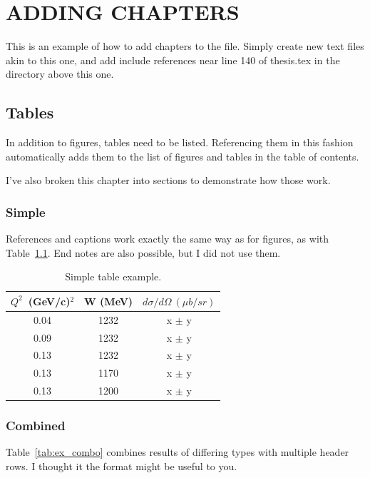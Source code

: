 \chapter{ADDING CHAPTERS}

This is an example of how to add chapters to the file.  Simply create new text files akin to
this one, and add include references near line 140 of thesis.tex in the directory above this one.

\section{Tables} 
In addition to figures, tables need to be listed. 
Referencing them in this fashion automatically adds them to the list of
figures and tables in the table of contents.

I've also broken this chapter into sections to demonstrate how those work.


\subsection{Simple}

References and captions work exactly the same way as for figures, as
with Table~\ref{tab:ex_simple}. End notes are also possible, but I did
not use them.
  


\begin {table}[!htbp]
\caption {Simple table example.} 
\centering
\begin{tabular}{|c |c |c|}
\hline
 $Q^2$~(GeV/c)$^2$	&W (MeV) & $d\sigma/d\Omega~(\mu b/sr)$\\
\hline																	
	0.04 &	1232	&	x	$\pm$ y \\	 \hline
	0.09 &	1232	&	x	$\pm$ y \\			 \hline
	0.13 &	1232	&	x	$\pm$ y \\	
\hline
	0.13 &	1170	&	x	$\pm$ y \\		 \hline
	0.13 &	1200	&	x	$\pm$ y \\		 \hline
\end{tabular}
\label{tab:ex_simple} 
\end{table}


\subsection{Combined}

Table~\ref{tab:ex_combo} combines results of differing types with
multiple header rows.  I thought it the format might be useful to you.


